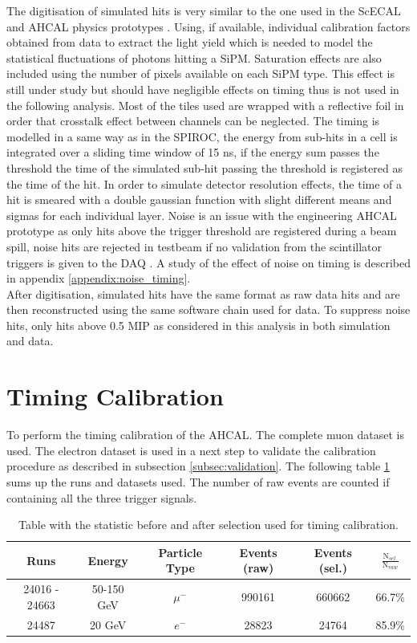 \documentclass[twoside,a4paper,11pt]{article}
\begin{document}
The digitisation of simulated hits is very similar to the one used in the ScECAL and AHCAL physics prototypes \cite{CAN-002, CAN-010, JINST-6}. Using, if available, individual calibration factors obtained from data to extract the light yield which is needed to model the statistical fluctuations of photons hitting a SiPM. Saturation effects are also included using the number of pixels available on each SiPM type. This effect is still under study but should have negligible effects on timing thus is not used in the following analysis. Most of the tiles used are wrapped with a reflective foil in order that crosstalk effect between channels can be neglected. The timing is modelled in a same way as in the SPIROC, the energy from sub-hits in a cell is integrated over a sliding time window of 15 ns, if the energy sum passes the threshold the time of the simulated sub-hit passing the threshold is registered as the time of the hit. In order to simulate detector resolution effects, the time of a hit is smeared with a double gaussian function with slight different means and sigmas for each individual layer. Noise is an issue with the engineering AHCAL prototype as only hits above the trigger threshold are registered during a beam spill, noise hits are rejected in testbeam if no validation from the scintillator triggers is given to the DAQ \cite{DAQ}. A study of the effect of noise on timing is described in appendix \ref{appendix:noise_timing}.\\
After digitisation, simulated hits have the same format as raw data hits and are then reconstructed using the same software chain used for data. To suppress noise hits, only hits above 0.5 MIP as considered in this analysis in both simulation and data.

\section{Timing Calibration}
To perform the timing calibration of the AHCAL. The complete muon dataset is used. The electron dataset is used in a next step to validate the calibration procedure as described in subsection \ref{subsec:validation}. The following table \ref{table:mu_elec_runs} sums up the runs and datasets used. The number of raw events are counted if containing all the three trigger signals.
\begin{table}[htbp]
\centering
  \begin{tabular}{@{} cccccc @{}}
    \hline
    Runs & Energy & Particle Type & Events (raw) & Events (sel.) & $\frac{\text{N$_{sel.}$}}{\text{N$_{raw}$}}$ \\ 
    \hline
     24016 - 24663 & 50-150 GeV & $\mu^-$ & 990161 & 660662 & 66.7\% \\ 
     24487 & 20 GeV & $e^-$ & 28823 & 24764 & 85.9\% \\
    \hline
  \end{tabular}
  \caption{Table with the statistic before and after selection used for timing calibration.}
  \label{table:mu_elec_runs}
\end{table}
\end{document}
